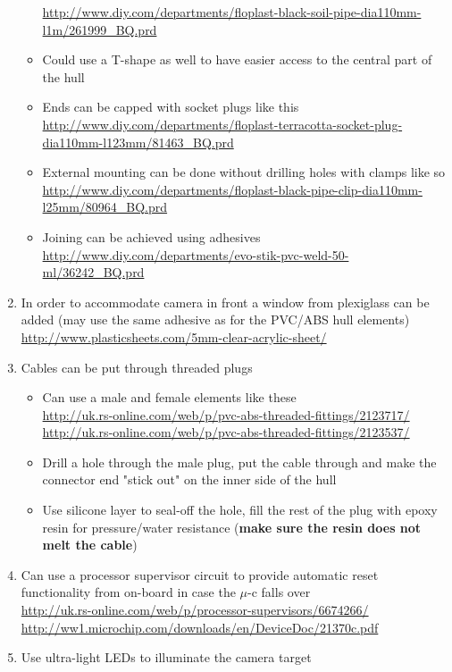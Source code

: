 \documentclass[11pt,a4paper,oneside]{report}
\begin{document}
\begin{enumerate}
\begin{itemize}
		\url{http://www.diy.com/departments/floplast-black-soil-pipe-dia110mm-l1m/261999_BQ.prd}
	\item Could use a T-shape as well to have easier access to the central part of the hull
	\item Ends can be capped with socket plugs like this \\
		\url{http://www.diy.com/departments/floplast-terracotta-socket-plug-dia110mm-l123mm/81463_BQ.prd}
	\item External mounting can be done without drilling holes with clamps like so \\
		\url{http://www.diy.com/departments/floplast-black-pipe-clip-dia110mm-l25mm/80964_BQ.prd}
	\item Joining can be achieved using adhesives \\
		\url{http://www.diy.com/departments/evo-stik-pvc-weld-50-ml/36242_BQ.prd}
	\end{itemize}
\item In order to accommodate camera in front a window from plexiglass can be added (may use
	the same adhesive as for the PVC/ABS hull elements) \\
	\url{http://www.plasticsheets.com/5mm-clear-acrylic-sheet/}
\item Cables can be put through threaded plugs
	\begin{itemize}
	\item Can use a male and female elements like these \\
		\url{http://uk.rs-online.com/web/p/pvc-abs-threaded-fittings/2123717/} \\
		\url{http://uk.rs-online.com/web/p/pvc-abs-threaded-fittings/2123537/}
	\item Drill a hole through the male plug, put the cable through and make the
		connector end "stick out" on the inner side of the hull
	\item Use silicone layer to seal-off the hole, fill the rest of the plug with
		epoxy resin for pressure/water resistance (\textbf{make sure the resin does not
		melt the cable})
	\end{itemize}
\item Can use a processor supervisor circuit to provide automatic reset functionality
	from on-board in case the $\mu$-c falls over \\
	\url{http://uk.rs-online.com/web/p/processor-supervisors/6674266/} \\
	\url{http://ww1.microchip.com/downloads/en/DeviceDoc/21370c.pdf}
\item Use ultra-light LEDs to illuminate the camera target \\

\end{enumerate}
\end{document}
